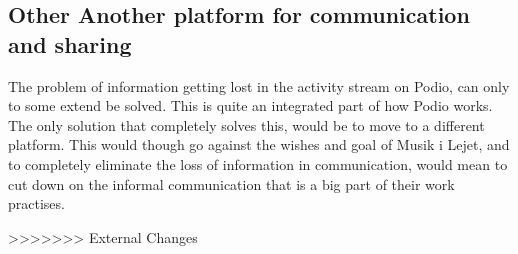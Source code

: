 \subsection{Other Another platform for communication and sharing}
The problem of information getting lost in the activity stream on Podio, can only to some extend be solved. This is quite an integrated part of how Podio works. The only solution that completely solves this, would be to move to a different platform. This would though go against the wishes and goal of Musik i Lejet, and to completely eliminate the loss of information in communication, would mean to cut down on the informal communication that is a big part of their work practises.

>>>>>>> External Changes
